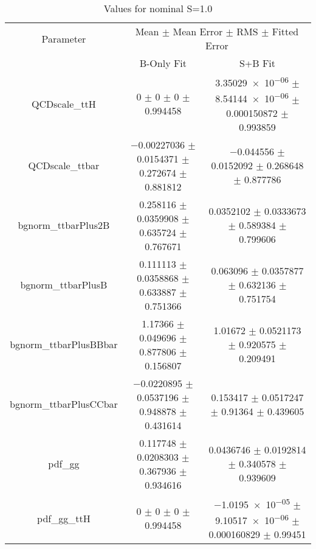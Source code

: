 \begin{table}
\centering
\caption{Values for nominal S=1.0}
\begin{tabular}{ccc}
\toprule
Parameter & \multicolumn{2}{c}{Mean $\pm$ Mean Error $\pm$ RMS $\pm$ Fitted Error}\\
 & B-Only Fit & S+B Fit\\
\midrule
QCDscale\_ttH & \num{0} $\pm$ \num{0} $\pm$ \num{0} $\pm$ \num{0.994458} & \num{3.35029e-06} $\pm$ \num{8.54144e-06} $\pm$ \num{0.000150872} $\pm$ \num{0.993859}\\
QCDscale\_ttbar & \num{-0.00227036} $\pm$ \num{0.0154371} $\pm$ \num{0.272674} $\pm$ \num{0.881812} & \num{-0.044556} $\pm$ \num{0.0152092} $\pm$ \num{0.268648} $\pm$ \num{0.877786}\\
bgnorm\_ttbarPlus2B & \num{0.258116} $\pm$ \num{0.0359908} $\pm$ \num{0.635724} $\pm$ \num{0.767671} & \num{0.0352102} $\pm$ \num{0.0333673} $\pm$ \num{0.589384} $\pm$ \num{0.799606}\\
bgnorm\_ttbarPlusB & \num{0.111113} $\pm$ \num{0.0358868} $\pm$ \num{0.633887} $\pm$ \num{0.751366} & \num{0.063096} $\pm$ \num{0.0357877} $\pm$ \num{0.632136} $\pm$ \num{0.751754}\\
bgnorm\_ttbarPlusBBbar & \num{1.17366} $\pm$ \num{0.049696} $\pm$ \num{0.877806} $\pm$ \num{0.156807} & \num{1.01672} $\pm$ \num{0.0521173} $\pm$ \num{0.920575} $\pm$ \num{0.209491}\\
bgnorm\_ttbarPlusCCbar & \num{-0.0220895} $\pm$ \num{0.0537196} $\pm$ \num{0.948878} $\pm$ \num{0.431614} & \num{0.153417} $\pm$ \num{0.0517247} $\pm$ \num{0.91364} $\pm$ \num{0.439605}\\
pdf\_gg & \num{0.117748} $\pm$ \num{0.0208303} $\pm$ \num{0.367936} $\pm$ \num{0.934616} & \num{0.0436746} $\pm$ \num{0.0192814} $\pm$ \num{0.340578} $\pm$ \num{0.939609}\\
pdf\_gg\_ttH & \num{0} $\pm$ \num{0} $\pm$ \num{0} $\pm$ \num{0.994458} & \num{-1.0195e-05} $\pm$ \num{9.10517e-06} $\pm$ \num{0.000160829} $\pm$ \num{0.99451}\\
\bottomrule
\end{tabular}
\end{table}
